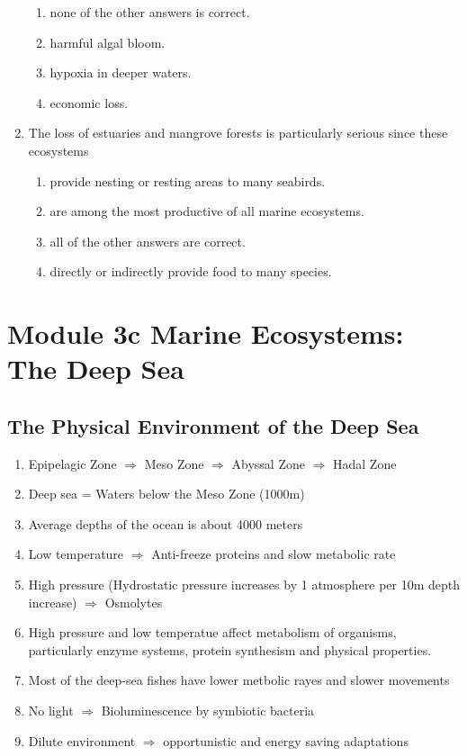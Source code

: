 \documentclass{report}
\begin{document}
\begin{enumerate}
    \begin{enumerate}
        \item   none of the other answers is correct. 
        \item   harmful algal bloom. 
        \item   hypoxia in deeper waters. 
        \item   economic loss. 
    \end{enumerate}
    \item The loss of estuaries and mangrove forests is particularly serious since these ecosystems
    \begin{enumerate}
        \item   provide nesting or resting areas to many seabirds. 
        \item   are among the most productive of all marine ecosystems. 
        \item   all of the other answers are correct. 
        \item   directly or indirectly provide food to many species. 
    \end{enumerate}
\end{enumerate}


\chapter{Module 3c Marine Ecosystems: The Deep Sea}
\section{The Physical Environment of the Deep Sea}
\begin{enumerate}
    \item Epipelagic Zone $\Rightarrow $ Meso Zone $\Rightarrow $ Abyssal Zone $\Rightarrow $ Hadal Zone
    \item Deep sea = Waters below the Meso Zone (1000m)
    \item Average depths of the ocean is about 4000 meters
    \item Low temperature $\Rightarrow $ Anti-freeze proteins and slow metabolic rate
    \item High pressure (Hydrostatic pressure increases by 1 atmosphere per 10m depth increase) $\Rightarrow $ Osmolytes
    \item High pressure and low temperatue affect metabolism of organisms, particularly enzyme systems, protein synthesism and physical properties.
    \item Most of the deep-sea fishes have lower metbolic rayes and slower movements
    \item No light $\Rightarrow $ Bioluminescence by symbiotic bacteria 
    \item Dilute environment $\Rightarrow $ opportunistic and energy saving adaptations
\end{enumerate}
\end{document}
